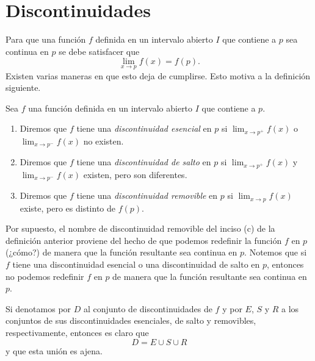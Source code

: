 \documentclass[12pt,a4paper]{book}
\begin{document}
    \section{Discontinuidades}

    Para que una función $f$ definida en un intervalo abierto $I$ que contiene a
    $p$ sea continua en $p$ se debe satisfacer que
    \begin{equation*}
        \lim_{x\to p}f(x)=f(p).
    \end{equation*}
    Existen varias maneras en que esto deja de cumplirse. Esto motiva a la
    definición siguiente.

    \begin{definicion}\label{def:42}
        Sea $f$ una función definida en un intervalo abierto $I$ que contiene a $p$.
        \begin{enumerate}[nosep]
            \item Diremos que $f$ tiene una \textit{discontinuidad esencial} en $p$ si $\lim_{x\to p^{+}}f(x)$ o
            $\lim_{x\to p^{-}}f(x)$ no existen.
            \item Diremos que $f$ tiene una \textit{discontinuidad de salto} en $p$ si $\lim_{x\to p^{+}}f(x)$ y
            $\lim_{x\to p^{-}}f(x)$ existen, pero son diferentes.
            \item Diremos que $f$ tiene una \textit{discontinuidad removible} en $p$ si $\lim_{x\to p}f(x)$
            existe, pero es distinto de $f(p)$.
        \end{enumerate}
    \end{definicion}

    Por supuesto, el nombre de discontinuidad removible del inciso (c) de la
    definición anterior proviene del hecho de que podemos redefinir la función $f$
    en $p$ (¿cómo?) de manera que la función resultante sea continua en $p$. Notemos
    que si $f$ tiene una discontinuidad esencial o una discontinuidad de salto en
    $p$, entonces no podemos redefinir $f$ en $p$ de manera que la función resultante
    sea continua en $p$.

    Si denotamos por $D$ al conjunto de discontinuidades de $f$ y por $E$, $S$ y
    $R$ a los conjuntos de sus discontinuidades esenciales, de salto y removibles,
    respectivamente, entonces es claro que
    \begin{equation*}
        D=E\cup S\cup R
    \end{equation*}
    y que esta unión es ajena.
\end{document}
